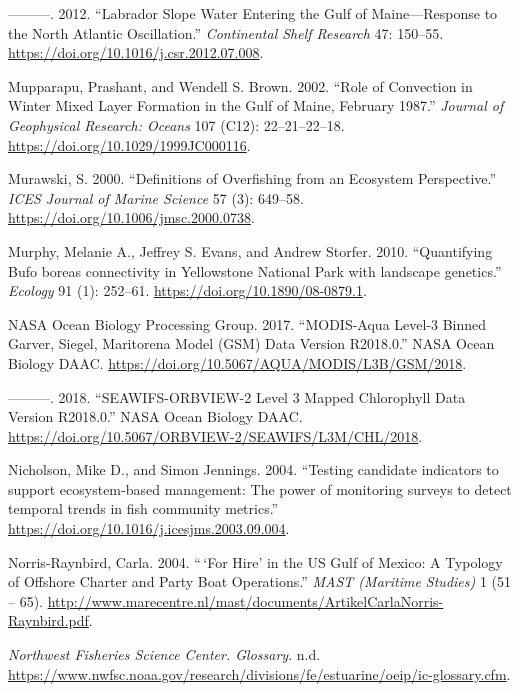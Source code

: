 \documentclass[
]{book}
\newlength{\cslhangindent}
\newenvironment{cslreferences}%
  {\setlength{\parindent}{0pt}%
  \everypar{\setlength{\hangindent}{\cslhangindent}}\ignorespaces}%
  {\par}
\begin{document}
\begin{cslreferences}
\leavevmode\hypertarget{ref-mountain2012}{}%
---------. 2012. ``Labrador Slope Water Entering the Gulf of Maine---Response to the North Atlantic Oscillation.'' \emph{Continental Shelf Research} 47: 150--55. \url{https://doi.org/10.1016/j.csr.2012.07.008}.

\leavevmode\hypertarget{ref-mupparapu_role_2002}{}%
Mupparapu, Prashant, and Wendell S. Brown. 2002. ``Role of Convection in Winter Mixed Layer Formation in the Gulf of Maine, February 1987.'' \emph{Journal of Geophysical Research: Oceans} 107 (C12): 22--21--22--18. \url{https://doi.org/10.1029/1999JC000116}.

\leavevmode\hypertarget{ref-murawski_definitions_2000}{}%
Murawski, S. 2000. ``Definitions of Overfishing from an Ecosystem Perspective.'' \emph{ICES Journal of Marine Science} 57 (3): 649--58. \url{https://doi.org/10.1006/jmsc.2000.0738}.

\leavevmode\hypertarget{ref-Murphy2010}{}%
Murphy, Melanie A., Jeffrey S. Evans, and Andrew Storfer. 2010. ``Quantifying Bufo boreas connectivity in Yellowstone National Park with landscape genetics.'' \emph{Ecology} 91 (1): 252--61. \url{https://doi.org/10.1890/08-0879.1}.

\leavevmode\hypertarget{ref-NASA2}{}%
NASA Ocean Biology Processing Group. 2017. ``MODIS-Aqua Level-3 Binned Garver, Siegel, Maritorena Model (GSM) Data Version R2018.0.'' NASA Ocean Biology DAAC. \url{https://doi.org/10.5067/AQUA/MODIS/L3B/GSM/2018}.

\leavevmode\hypertarget{ref-NASA1}{}%
---------. 2018. ``SEAWIFS-ORBVIEW-2 Level 3 Mapped Chlorophyll Data Version R2018.0.'' NASA Ocean Biology DAAC. \url{https://doi.org/10.5067/ORBVIEW-2/SEAWIFS/L3M/CHL/2018}.

\leavevmode\hypertarget{ref-Nicholson2004}{}%
Nicholson, Mike D., and Simon Jennings. 2004. ``Testing candidate indicators to support ecosystem-based management: The power of monitoring surveys to detect temporal trends in fish community metrics.'' \url{https://doi.org/10.1016/j.icesjms.2003.09.004}.

\leavevmode\hypertarget{ref-norris-raynbird_for_2004}{}%
Norris-Raynbird, Carla. 2004. ``\,`For Hire' in the US Gulf of Mexico: A Typology of Offshore Charter and Party Boat Operations.'' \emph{MAST (Maritime Studies)} 1 (51 -- 65). \url{http://www.marecentre.nl/mast/documents/ArtikelCarlaNorris-Raynbird.pdf}.

\leavevmode\hypertarget{ref-nwfsc}{}%
\emph{Northwest Fisheries Science Center. Glossary}. n.d. \url{https://www.nwfsc.noaa.gov/research/divisions/fe/estuarine/oeip/ic-glossary.cfm}.


\end{cslreferences}
\end{document}
